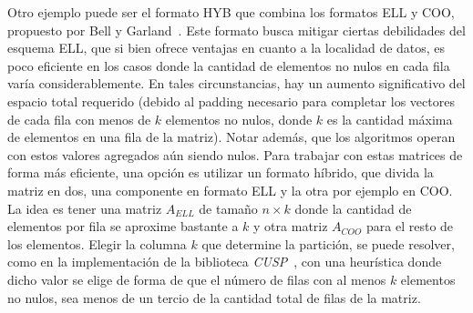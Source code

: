Otro ejemplo puede ser el formato HYB que combina los formatos ELL y COO, propuesto por Bell y Garland~\cite{Bell2009}. %
Este formato busca mitigar ciertas debilidades del esquema ELL, que si bien ofrece ventajas en cuanto a la localidad de datos, es poco eficiente en los casos donde la cantidad de elementos no nulos en cada fila varía considerablemente. En tales circunstancias, 
hay un aumento significativo del espacio total requerido (debido al padding necesario para completar los vectores de cada fila con menos de $k$ elementos no nulos, donde $k$ es la cantidad máxima de elementos en una fila de la matriz). Notar además, que los algoritmos operan con estos valores agregados aún siendo nulos.
Para trabajar con estas matrices de forma más eficiente, una opción es utilizar un formato híbrido, que divida la matriz en dos, una componente en formato ELL y la otra por ejemplo en COO. La idea es tener una matriz $A_{ELL}$ de tamaño $n\times k$ donde la cantidad de elementos por fila se aproxime bastante a $k$ y otra matriz $A_{COO}$ para el resto de los elementos. 
Elegir la columna $k$ que determine la partición, se puede resolver, como en la implementación de la biblioteca \textit{CUSP}~\cite{cusp-bell}, con una heurística donde dicho valor se elige de forma de que el número de filas con al menos $k$ elementos no nulos, sea menos de un tercio de la cantidad total de filas de la matriz.



